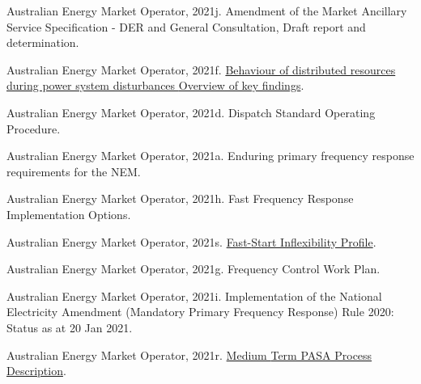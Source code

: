 \documentclass[12pt,a4paper,]{report}
\newlength{\cslhangindent}
\newenvironment{CSLReferences}[2] %
 {%
  \setlength{\parindent}{0pt}
  \ifodd #1 \everypar{\setlength{\hangindent}{\cslhangindent}}\ignorespaces\fi
  \ifnum #2 > 0
  \setlength{\parskip}{#2\baselineskip}
  \fi
 }%
 {}
\begin{document}
\begin{CSLReferences}{1}{0}
\leavevmode{}%
Australian Energy Market Operator, 2021j. Amendment of the {Market
Ancillary Service Specification} - {DER} and {General Consultation},
{Draft} report and determination.

\leavevmode{}%
Australian Energy Market Operator, 2021f.
\href{https://aemo.com.au/en/initiatives/major-programs/nem-distributed-energy-resources-der-program/operations/der-behaviour-during-disturbances}{Behaviour
of distributed resources during power system disturbances {Overview} of
key findings}.

\leavevmode{}%
Australian Energy Market Operator, 2021d. Dispatch {Standard Operating
Procedure}.

\leavevmode{}%
Australian Energy Market Operator, 2021a. Enduring primary frequency
response requirements for the {NEM}.

\leavevmode{}%
Australian Energy Market Operator, 2021h. Fast {Frequency Response
Implementation Options}.

\leavevmode{}%
Australian Energy Market Operator, 2021s.
\href{https://aemo.com.au/-/media/files/electricity/nem/security_and_reliability/dispatch/policy_and_process/fast-start-unit-inflexibility-profile.pdf}{Fast-{Start
Inflexibility Profile}}.

\leavevmode{}%
Australian Energy Market Operator, 2021g. Frequency {Control Work Plan}.

\leavevmode{}%
Australian Energy Market Operator, 2021i. Implementation of the
{National Electricity Amendment} ({Mandatory Primary Frequency
Response}) {Rule} 2020: {Status} as at 20 {Jan} 2021.

\leavevmode{}%
Australian Energy Market Operator, 2021r.
\href{https://aemo.com.au/-/media/files/electricity/nem/planning_and_forecasting/pasa/mt-pasa-process-description-v62.pdf?la=en}{Medium
{Term PASA Process Description}}.


\end{CSLReferences}
\end{document}
